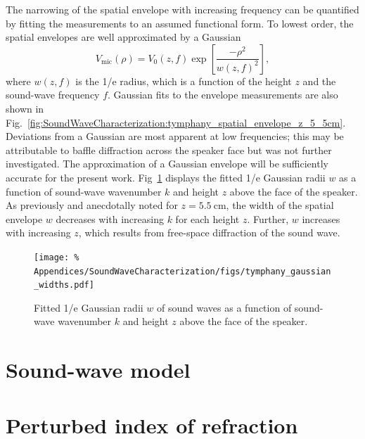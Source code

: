 The narrowing of the spatial envelope with increasing frequency
can be quantified by fitting the measurements
to an assumed functional form.
To lowest order, the spatial envelopes are well approximated by a Gaussian
\begin{equation}
  V_{\text{mic}}(\rho)
  =
  V_0(z, f)
  \exp\left[
    \frac{-\rho^2}{w(z, f)^2}
  \right],
  \label{eq:SoundWaveCharacterization:Gaussian}
\end{equation}
where $w(z, f)$ is the 1/e radius, which
is a function of the height $z$ and the sound-wave frequency $f$.
Gaussian fits to the envelope measurements are also shown in
Fig.~\ref{fig:SoundWaveCharacterization:tymphany_spatial_envelope_z_5_5cm}.
Deviations from a Gaussian are most apparent at low frequencies;
this may be attributable to baffle diffraction across the speaker face but
was not further investigated.
The approximation of a Gaussian envelope
will be sufficiently accurate for the present work.
Fig~\ref{fig:SoundWaveCharacterization:tymphany_gaussian_widths}
displays the fitted 1/e Gaussian radii $w$ as a function of
sound-wave wavenumber $k$ and
height $z$ above the face of the speaker.
As previously and anecdotally noted for $z = \SI{5.5}{\centi\meter}$,
the width of the spatial envelope $w$
decreases with increasing $k$ for each height $z$.
Further, $w$ increases with increasing $z$, which
results from free-space diffraction of the sound wave.

\begin{figure}
  \centering
  \texttt{[image: \%
    Appendices/SoundWaveCharacterization/figs/tymphany\_gaussian\_widths.pdf]}
  \caption[Gaussian widths of sound waves]{%
    Fitted 1/e Gaussian radii $w$ of sound waves
    as a function of sound-wave wavenumber $k$ and
    height $z$ above the face of the speaker.
  }
\label{fig:SoundWaveCharacterization:tymphany_gaussian_widths}
\end{figure}


\section{Sound-wave model}
\label{sec:SoundWaveCharacterization:Model}


\section{Perturbed index of refraction}
\label{sec:SoundWaveCharacterization:PerturbedIndexOfRefractiion}




